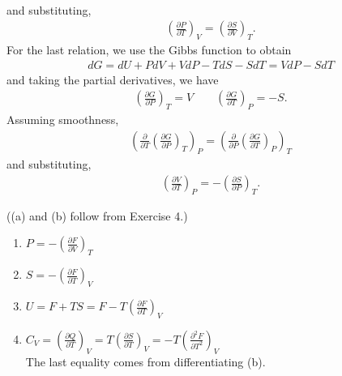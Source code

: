 \documentclass[a4paper,12pt]{article}
\begin{document}
\begin{enumerate}[label=\textbf{[\arabic*]}]
\begin{align*}
            \end{align*}
            and substituting,
            \begin{align*}
                \left( \frac{\partial P}{\partial T} \right)_V = \left( \frac{\partial S}{\partial V} \right)_T.
            \end{align*}
            For the last relation, we use the Gibbs function to obtain
            \begin{align*}
                dG = dU + PdV + VdP - TdS - SdT = VdP - SdT
            \end{align*}
            and taking the partial derivatives, we have
            \begin{align*}
                \left( \frac{\partial G}{\partial P} \right)_T = V \qquad \left( \frac{\partial G}{\partial T} \right)_P = -S.
            \end{align*}
            Assuming smoothness,
            \begin{align*}
                \left( \frac{\partial}{\partial T} \left( \frac{\partial G}{\partial P} \right)_T \right)_P = \left( \frac{\partial}{\partial P} \left( \frac{\partial G}{\partial T} \right)_P \right)_T
            \end{align*}
            and substituting,
            \begin{align*}
                \left( \frac{\partial V}{\partial T} \right)_P = -\left( \frac{\partial S}{\partial P} \right)_T.
            \end{align*}

        \item
            ((a) and (b) follow from Exercise 4.)
            \begin{enumerate}
                \item
                    $P = -{\left( \frac{\partial F}{\partial V} \right)_T}$

                \item
                    $S = -{\left( \frac{\partial F}{\partial T} \right)_V}$

                \item
                    $U = F + TS = F - T\left( \frac{\partial F}{\partial T} \right)_V$

                \item
                    $C_V = \left( \frac{\partial Q}{\partial T} \right)_V = T \left( \frac{\partial S}{\partial T} \right)_V = -T \left( \frac{\partial^2 F}{\partial T^2} \right)_V$ \\
                    The last equality comes from differentiating (b).


\end{enumerate}
\end{enumerate}
\end{document}
